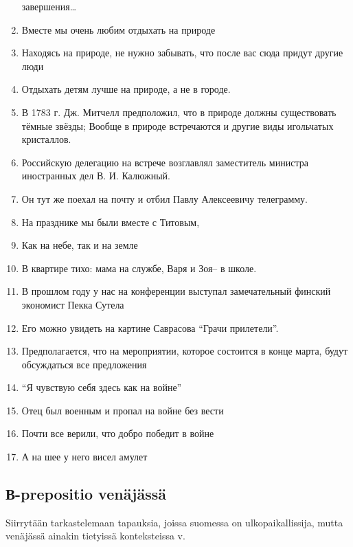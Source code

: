 \documentclass[]{scrreprt}
\begin{document}
\begin{enumerate}
  завершения\ldots{}
\item
  Вместе мы очень любим отдыхать на природе
\item
  Находясь на природе, не нужно забывать, что после вас сюда придут
  другие люди
\item
  Отдыхать детям лучше на природе, а не в городе.
\item
  В 1783 г. Дж. Митчелл предположил, что в природе должны существовать
  тёмные звёзды; Вообще в природе встречаются и другие виды игольчатых
  кристаллов.
\item
  Российскую делегацию на встрече возглавлял заместитель министра
  иностранных дел В. И. Калюжный.
\item
  Он тут же поехал на почту и отбил Павлу Алексеевичу телеграмму.
\item
  На празднике мы были вместе с Титовым,
\item
  Как на небе, так и на земле
\item
  В квартире тихо: мама на службе, Варя и Зоя-- в школе.
\item
  В прошлом году у нас на конференции выступал замечательный финский
  экономист Пекка Сутела
\item
  Его можно увидеть на картине Саврасова ``Грачи прилетели''.
\item
  Предполагается, что на мероприятии, которое состоится в конце марта,
  будут обсуждаться все предложения
\item
  ``Я чувствую себя здесь как на войне''
\item
  Отец был военным и пропал на войне без вести
\item
  Почти все верили, что добро победит в войне
\item
  А на шее у него висел амулет
\end{enumerate}

\subsection{В-prepositio
venäjässä}\label{ux432-prepositio-venuxe4juxe4ssuxe4}

Siirrytään tarkastelemaan tapauksia, joissa suomessa on
ulkopaikallissija, mutta venäjässä ainakin tietyissä konteksteissa v.
\end{document}
